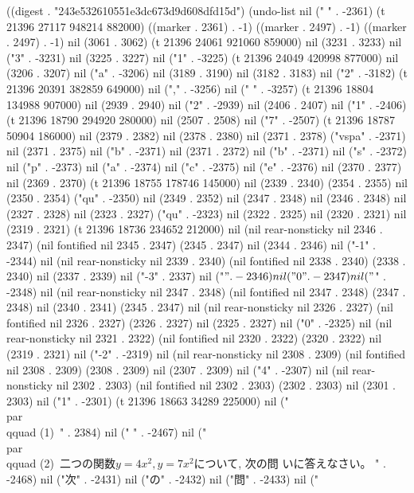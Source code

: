 
((digest . "243e532610551e3dc673d9d608dfd15d") (undo-list nil ("
" . -2361) (t 21396 27117 948214 882000) ((marker . 2361) . -1) ((marker . 2497) . -1) ((marker . 2497) . -1) nil (3061 . 3062) (t 21396 24061 921060 859000) nil (3231 . 3233) nil ("3" . -3231) nil (3225 . 3227) nil ("1" . -3225) (t 21396 24049 420998 877000) nil (3206 . 3207) nil ("a" . -3206) nil (3189 . 3190) nil (3182 . 3183) nil ("2" . -3182) (t 21396 20391 382859 649000) nil ("," . -3256) nil (" " . -3257) (t 21396 18804 134988 907000) nil (2939 . 2940) nil ("2" . -2939) nil (2406 . 2407) nil ("1" . -2406) (t 21396 18790 294920 280000) nil (2507 . 2508) nil ("7" . -2507) (t 21396 18787 50904 186000) nil (2379 . 2382) nil (2378 . 2380) nil (2371 . 2378) ("vspa" . -2371) nil (2371 . 2375) nil ("b" . -2371) nil (2371 . 2372) nil ("b" . -2371) nil ("s" . -2372) nil ("p" . -2373) nil ("a" . -2374) nil ("c" . -2375) nil ("e" . -2376) nil (2370 . 2377) nil (2369 . 2370) (t 21396 18755 178746 145000) nil (2339 . 2340) (2354 . 2355) nil (2350 . 2354) ("qu" . -2350) nil (2349 . 2352) nil (2347 . 2348) nil (2346 . 2348) nil (2327 . 2328) nil (2323 . 2327) ("qu" . -2323) nil (2322 . 2325) nil (2320 . 2321) nil (2319 . 2321) (t 21396 18736 234652 212000) nil (nil rear-nonsticky nil 2346 . 2347) (nil fontified nil 2345 . 2347) (2345 . 2347) nil (2344 . 2346) nil ("-1" . -2344) nil (nil rear-nonsticky nil 2339 . 2340) (nil fontified nil 2338 . 2340) (2338 . 2340) nil (2337 . 2339) nil ("-3" . 2337) nil ("$" . -2346) nil ("0" . -2347) nil ("$" . -2348) nil (nil rear-nonsticky nil 2347 . 2348) (nil fontified nil 2347 . 2348) (2347 . 2348) nil (2340 . 2341) (2345 . 2347) nil (nil rear-nonsticky nil 2326 . 2327) (nil fontified nil 2326 . 2327) (2326 . 2327) nil (2325 . 2327) nil ("0" . -2325) nil (nil rear-nonsticky nil 2321 . 2322) (nil fontified nil 2320 . 2322) (2320 . 2322) nil (2319 . 2321) nil ("-2" . -2319) nil (nil rear-nonsticky nil 2308 . 2309) (nil fontified nil 2308 . 2309) (2308 . 2309) nil (2307 . 2309) nil ("4" . -2307) nil (nil rear-nonsticky nil 2302 . 2303) (nil fontified nil 2302 . 2303) (2302 . 2303) nil (2301 . 2303) nil ("1" . -2301) (t 21396 18663 34289 225000) nil ("\\par \\qquad (1)~" . 2384) nil ("
" . -2467) nil ("\\par \\qquad (2)~二つの関数$y=4x^{2}, y=7x^{2}$について, 次の問
いに答えなさい。
" . -2468) nil ("次" . -2431) nil ("の" . -2432) nil ("問" . -2433) nil ("
